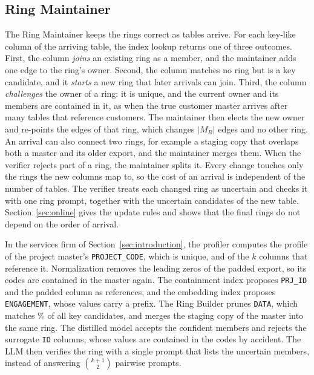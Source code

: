 \subsection{Ring Maintainer}
\label{sec:arch_maintainer}
The Ring Maintainer keeps the rings correct as tables arrive.
For each key-like column of the arriving table, the index lookup returns one of three outcomes.
First, the column \emph{joins} an existing ring as a member, and the maintainer adds one edge to the ring's owner.
Second, the column matches no ring but is a key candidate, and it \emph{starts} a new ring that later arrivals can join.
Third, the column \emph{challenges} the owner of a ring: it is unique, and the current owner and its members are contained in it, as when the true customer master arrives after many tables that reference customers.
The maintainer then elects the new owner and re-points the edges of that ring, which changes $|M_R|$ edges and no other ring.
An arrival can also connect two rings, for example a staging copy that overlaps both a master and its older export, and the maintainer merges them.
When the verifier rejects part of a ring, the maintainer splits it.
Every change touches only the rings the new columns map to, so the cost of an arrival is independent of the number of tables.
The verifier treats each changed ring as uncertain and checks it with one ring prompt, together with the uncertain candidates of the new table.
Section~\ref{sec:online} gives the update rules and shows that the final rings do not depend on the order of arrival.

\begin{example}
In the services firm of Section~\ref{sec:introduction}, the profiler computes the profile of the project master's \texttt{PROJECT\_CODE}, which is unique, and of the $k$ columns that reference it.
Normalization removes the leading zeros of the padded export, so its codes are contained in the master again.
The containment index proposes \texttt{PRJ\_ID} and the padded column as references, and the embedding index proposes \texttt{ENGAGEMENT}, whose values carry a prefix.
The Ring Builder prunes \texttt{DATA}, which matches \% of all key candidates, and merges the staging copy of the master into the same ring.
The distilled model accepts the confident members and rejects the surrogate \texttt{ID} columns, whose values are contained in the codes by accident.
The LLM then verifies the ring with a single prompt that lists the uncertain members, instead of answering $\binom{k+1}{2}$ pairwise prompts.
\end{example}

